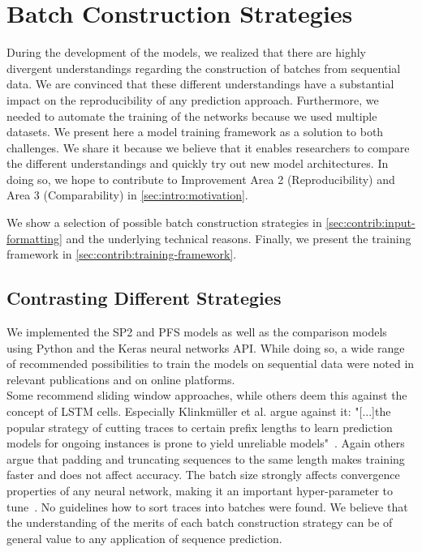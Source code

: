 \chapter{Batch Construction Strategies}\label{chap:training-framework}
During the development of the models, we realized that there are highly divergent understandings regarding the construction of batches from sequential data.
We are convinced that these different understandings have a substantial impact on the reproducibility of any prediction approach.
Furthermore, we needed to automate the training of the networks because we used multiple datasets.
We present here a model training framework as a solution to both challenges.
We share it because we believe that it enables researchers to compare the different understandings and quickly try out new model architectures.
In doing so, we hope to contribute to Improvement Area 2 (Reproducibility) and Area 3 (Comparability) in \autoref{sec:intro:motivation}.

We show a selection of possible batch construction strategies in \autoref{sec:contrib:input-formatting} and the underlying technical reasons. Finally, we present the training framework in \autoref{sec:contrib:training-framework}.

\section{Contrasting Different Strategies}\label{sec:contrib:input-formatting}
We implemented the SP2 and PFS models as well as the comparison models using Python and the Keras neural networks API.
While doing so, a wide range of recommended possibilities to train the models on sequential data were noted in relevant publications and on online platforms.\\

Some recommend sliding window approaches, while others deem this against the concept of LSTM cells.
Especially Klinkmüller et al. argue against it: "[...]the popular strategy of cutting traces to certain prefix lengths to learn prediction models for ongoing instances is prone to yield unreliable models"~\cite{klinkmuller2018reliablemonitoring}.
Again others argue that padding and truncating sequences to the same length makes training faster and does not affect accuracy.
The batch size strongly affects convergence properties of any neural network, making it an important hyper-parameter to tune~\cite{keskar2016large}.
No guidelines how to sort traces into batches were found.
We believe that the understanding of the merits of each batch construction strategy can be of general value to any application of sequence prediction.\\

